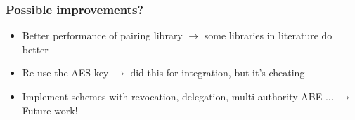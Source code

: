 \begin{frame}[c]
    \frametitle{Possible improvements?}

    \begin{itemize}
        \pause \item Better performance of pairing library \pause \alert{$\rightarrow$ some libraries in literature do better}
        \pause \item Re-use the AES key \pause \alert{$\rightarrow$ did this for integration, but it's cheating \smiley}
        \pause \item Implement schemes with revocation, delegation, multi-authority ABE ... \pause \alert{$\rightarrow$ Future work!}
    \end{itemize}
    

\end{frame}

